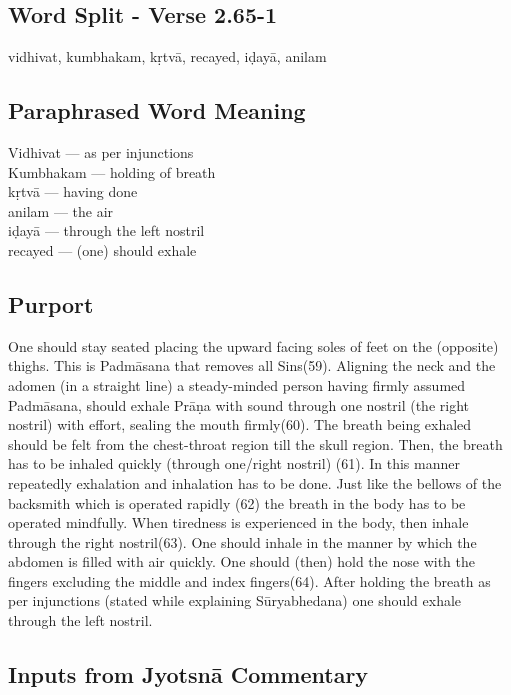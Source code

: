 \subsection*{Word Split - Verse 2.65-1}

vidhivat, kumbhakam, kṛtvā, recayed, iḍayā, anilam

\subsection*{Paraphrased Word Meaning}

\begin{multicols}{2}
Vidhivat --- as per injunctions\\
Kumbhakam --- holding of breath \\
kṛtvā --- having done \\
anilam --- the air \\
iḍayā --- through the left nostril\\
recayed --- (one) should exhale
\end{multicols}

\subsection*{Purport}


One should stay seated placing the upward facing soles of feet on the (opposite) thighs. This is Padmāsana that removes all Sins(59). Aligning the neck and the adomen (in a straight line) a steady-minded person having firmly assumed Padmāsana, should exhale Prāṇa with sound through one nostril (the right nostril) with effort, sealing the mouth firmly(60). The breath being exhaled should be felt from the chest-throat region till the skull region. Then, the breath has to be inhaled quickly (through one/right nostril) (61). In this manner repeatedly exhalation and inhalation has to be done. Just like the bellows of the backsmith which is operated rapidly (62) the breath in the body has to be operated mindfully. When tiredness is experienced in the body, then inhale through the right nostril(63). One should inhale in the manner by which the abdomen is filled with air quickly. One should (then) hold the nose with the fingers excluding the middle and index fingers(64). After holding the breath as per injunctions (stated while explaining Sūryabhedana) one should exhale through the left nostril.

\subsection*{Inputs from Jyotsnā Commentary}


